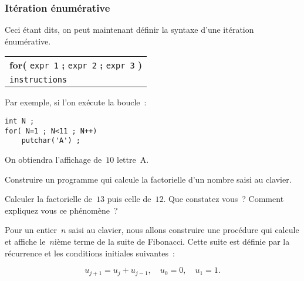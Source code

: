 \subsubsection{It\'eration \'enum\'erative}
\par
Ceci  \'etant  dits, on  peut  maintenant d\'efinir   la syntaxe  d'une
it\'eration \'enum\'erative.
\par
\begin{center}
  \begin{tabular}{l}
    \textbf{for(} \texttt{expr 1} \textbf{;} \texttt{expr 2} \textbf{;} 
    \texttt{expr 3} \textbf{)} \\
    \qquad \texttt{instructions} \\
  \end{tabular}
\end{center}
\par
Par exemple, si l'on ex\'ecute la boucle~:
\begin{verbatim}
int N ;
for( N=1 ; N<11 ; N++)
    putchar('A') ;
\end{verbatim}
On obtiendra l'affichage de~$10$ lettre~A.
\begin{exercice}
  Construire un programme qui calcule la factorielle d'un nombre saisi
  au clavier.
  \par
  Calculer la factorielle  de~$13$ puis celle  de~$12$.  Que constatez
  vous~? Comment expliquez vous ce ph\'enom\`ene~?
  \ifcorrection
  \begin{correction}
    
  \end{correction}
  \fi
\end{exercice}
\begin{exercice}
  Pour un entier~$n$ saisi    au clavier, nous allons  construire  une
  proc\'edure qui calcule et affiche le~$n$i\`eme terme de la suite de
  Fibonacci.   Cette suite est d\'efinie   par la r\'ecurrence et  les
  conditions initiales suivantes~:
  \par
  $$
  u_{j+1}=u_{j}+u_{j-1}, \quad u_{0}=0,\quad u_{1} =1.
  $$
  \ifcorrection
  \begin{correction}
    
  \end{correction}
  \fi
\end{exercice}
